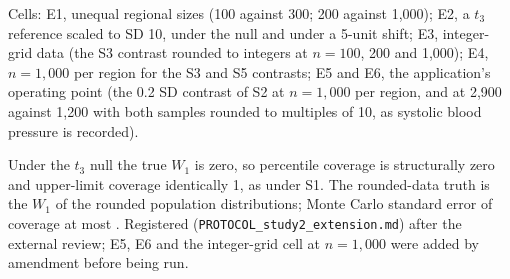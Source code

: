 \documentclass[AMA,Times1COL]{WileyNJDv5}
\begin{document}
\begin{table}[ht]
\centering
\caption{Registered extension of Study 2: unequal regional sizes, a $t_3$ reference distribution, integer-grid data, $n = 1{,}000$ per region and the application's operating point (0.2 SD). Bias, RMSE and mean width in the original units; coverage of the 95\% percentile interval and of its one-sided 97.5\% upper limit.\label{tab:study2_ext}}
\begin{tablenotes}
\item Cells: E1, unequal regional sizes (100 against 300; 200 against 1{,}000); E2, a $t_3$ reference scaled to SD 10, under the null and under a 5-unit shift; E3, integer-grid data (the S3 contrast rounded to integers at $n = 100$, 200 and 1{,}000); E4, $n = 1{,}000$ per region for the S3 and S5 contrasts; E5 and E6, the application's operating point (the 0.2 SD contrast of S2 at $n = 1{,}000$ per region, and at 2{,}900 against 1{,}200 with both samples rounded to multiples of 10, as systolic blood pressure is recorded).
\item Under the $t_3$ null the true $W_1$ is zero, so percentile coverage is structurally zero and upper-limit coverage identically 1, as under S1. The rounded-data truth is the $W_1$ of the rounded population distributions; Monte Carlo standard error of coverage at most . Registered (\texttt{PROTOCOL\_study2\_extension.md}) after the external review; E5, E6 and the integer-grid cell at $n = 1{,}000$ were added by amendment before being run.
\end{tablenotes}
\end{table}
\end{document}
